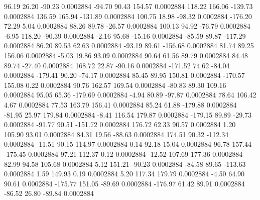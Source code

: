        96.19       26.20      -90.23     0.0002884
      -94.70       90.43      154.57     0.0002884
      118.22      166.06     -139.73     0.0002884
      136.59      165.94     -131.89     0.0002884
      100.75       18.98      -98.32     0.0002884
     -176.20       72.29        5.04     0.0002884
       88.26       89.78      -26.57     0.0002884
      100.13       94.92      -76.79     0.0002884
       -6.95      118.20      -90.39     0.0002884
       -2.16       95.68      -15.16     0.0002884
      -85.59       89.87     -117.29     0.0002884
       86.20       89.53       62.63     0.0002884
      -93.19       89.61     -156.68     0.0002884
       81.74       89.25      156.06     0.0002884
       -5.03       19.86       93.09     0.0002884
       90.64       61.56       89.79     0.0002884
       84.48       89.74      -27.40     0.0002884
      168.72       22.87      -90.16     0.0002884
     -171.52       74.62      -84.04     0.0002884
     -179.41       90.20      -74.17     0.0002884
       85.45       89.95      150.81     0.0002884
     -170.57      155.08        0.22     0.0002884
       90.76      162.57      169.54     0.0002884
      -80.83       89.30      109.16     0.0002884
       95.05       65.36     -179.69     0.0002884
       -4.94       80.89      -97.87     0.0002884
       78.64      106.42        4.67     0.0002884
       77.53      163.79      156.41     0.0002884
       85.24       61.88     -179.88     0.0002884
      -81.95       25.97      179.84     0.0002884
       -8.41      116.54      179.87     0.0002884
     -179.15       89.89      -29.73     0.0002884
      -91.77       90.51     -151.72     0.0002884
      176.72       62.33       90.57     0.0002884
        1.20      105.90       93.01     0.0002884
       84.31       19.56      -88.63     0.0002884
      174.51       90.32     -112.34     0.0002884
      -11.51       90.15      114.97     0.0002884
        0.14       92.18       15.04     0.0002884
       96.78      157.44     -175.45     0.0002884
       97.21      112.37        0.12     0.0002884
      -12.52      107.69      177.36     0.0002884
       82.99       94.58      105.68     0.0002884
        5.12      151.21      -90.23     0.0002884
      -84.58       89.65     -113.63     0.0002884
        1.59      149.93        0.19     0.0002884
        5.20      117.34      179.79     0.0002884
       -4.50       64.90       90.61     0.0002884
     -175.77      151.05      -89.69     0.0002884
     -176.97       61.42       89.91     0.0002884
      -86.52       26.80      -89.84     0.0002884
